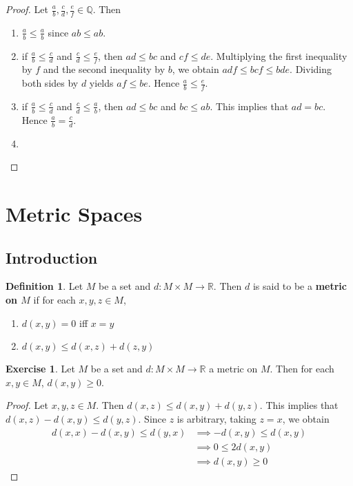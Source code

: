 \documentclass[12pt]{amsart}
\theoremstyle{definition}
\newtheorem{defn}[definition]{Definition}
\newtheorem{ex}[definition]{Exercise}
\newcommand{\R}{\mathbb{R}}
\newcommand{\Q}{\mathbb{Q}}
\begin{document}
	\begin{proof} Let $\frac{a}{b}, \frac{c}{d}, \frac{e}{f} \in \Q$. Then
		\begin{enumerate}
			\item  $\frac{a}{b} \leq \frac{a}{b}$ since $ab \leq ab$. 
			\item if $\frac{a}{b} \leq \frac{c}{d}$ and $\frac{c}{d} \leq  \frac{e}{f}$, then $ad \leq bc$ and $ cf \leq de$. Multiplying the first inequality by $f$ and the second inequality by $b$, we obtain $adf \leq bcf \leq bde$. Dividing both sides by $d$ yields $af \leq be$. Hence $\frac{a}{b} \leq \frac{e}{f}$. 
			\item if $\frac{a}{b} \leq \frac{c}{d}$ and $\frac{c}{d} \leq \frac{a}{b}$, then $ad \leq bc$ and $bc \leq ab$. This implies that $ad = bc$. Hence $\frac{a}{b} = \frac{c}{d}$.
			\item 
		\end{enumerate}
	\end{proof}
	
	
	
	
	
	
	
	
	
	
	
	
	
	
	
	
	
	\newpage
	\section{Metric Spaces}
	\subsection{Introduction}
	\begin{defn}
	Let $M$ be a set and $d: M \times M \rightarrow \R$. Then $d$ is said to be a \textbf{metric on $M$} if for each $x,y,z \in M$, 
	\begin{enumerate}
	\item $d(x,y) = 0$ iff $x = y$
	\item $d(x, y) \leq d(x, z) + d(z, y)$
\end{enumerate}	 
	\end{defn}	
	
	\begin{ex}
	Let $M$ be a set and $d: M \times M \rightarrow \R$ a metric on $M$. Then for each $x,y \in M$, $d(x,y) \geq 0$. 
	\end{ex}
	
	\begin{proof}
	Let $x, y, z \in M$. Then $d(x,z) \leq d(x, y) + d(y,z)$. This implies that $d(x,z) - d(x, y) \leq d(y, z)$. Since $z$ is arbitrary, taking $z=x$, we obtain 
	\begin{align*}
	d(x,x) - d(x, y) \leq d(y, x)
	& \implies - d(x, y) \leq d(x, y) \\
	& \implies 0 \leq 2 d(x,y) \\
	& \implies d(x,y) \geq 0
	\end{align*}
	\end{proof}		
	
\end{document}
